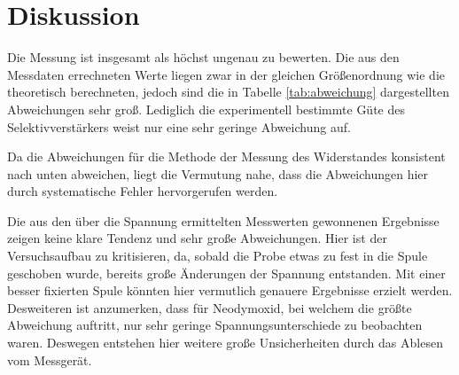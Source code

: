 \section{Diskussion}
\label{sec:Diskussion}



Die Messung ist insgesamt als höchst ungenau zu bewerten. Die aus den Messdaten errechneten
Werte liegen zwar in der gleichen Größenordnung wie die theoretisch berechneten,
jedoch sind die in Tabelle \ref{tab:abweichung} dargestellten Abweichungen sehr groß.
Lediglich die experimentell bestimmte Güte des Selektivverstärkers weist nur eine
sehr geringe Abweichung auf.

Da die Abweichungen für die Methode der Messung des Widerstandes konsistent nach
unten abweichen, liegt die Vermutung nahe, dass die Abweichungen hier durch
systematische Fehler hervorgerufen werden.

Die aus den über die Spannung ermittelten Messwerten gewonnenen Ergebnisse zeigen
keine klare Tendenz und sehr große Abweichungen. Hier ist der Versuchsaufbau zu
kritisieren, da, sobald die Probe etwas zu fest in die Spule geschoben wurde, bereits
große Änderungen der Spannung entstanden. Mit einer besser fixierten Spule könnten
hier vermutlich genauere Ergebnisse erzielt werden. Desweiteren ist anzumerken,
dass für Neodymoxid, bei welchem die größte Abweichung auftritt, nur sehr
geringe Spannungsunterschiede zu beobachten waren. Deswegen entstehen hier weitere
große Unsicherheiten durch das Ablesen vom Messgerät.
